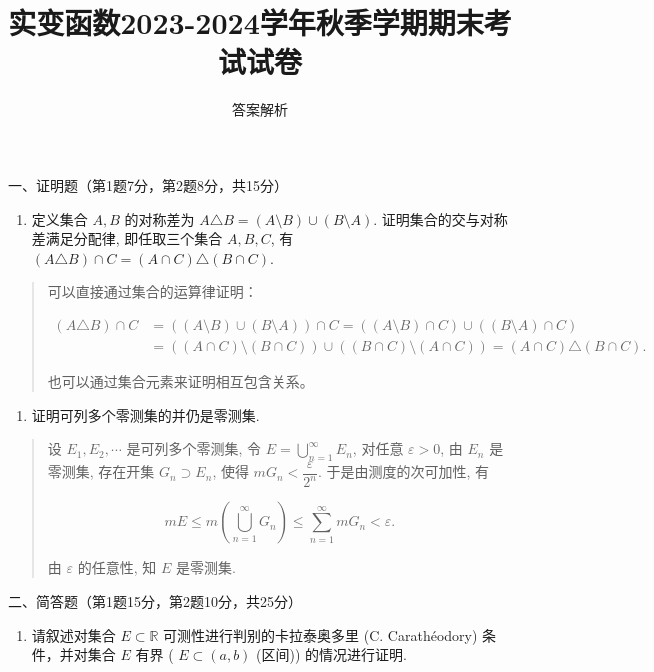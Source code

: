\documentclass[
]{article}
\title{实变函数2023-2024学年秋季学期期末考试试卷}
\subtitle{答案解析}
\author{}
\date{}
\providecommand{\tightlist}{%
  \setlength{\itemsep}{0pt}\setlength{\parskip}{0pt}}
\begin{document}
\maketitle

一、证明题（第1题7分，第2题8分，共15分）

\begin{enumerate}
\def\labelenumi{\arabic{enumi}.}
\tightlist
\item
  定义集合 \(A, B\) 的对称差为
  \(A \triangle B = (A \setminus B) \cup (B \setminus A)\).
  证明集合的交与对称差满足分配律, 即任取三个集合 \(A, B, C\), 有
  \((A \triangle B) \cap C = (A \cap C) \triangle (B \cap C)\).
\end{enumerate}

\begin{quote}
可以直接通过集合的运算律证明：

\[\begin{aligned}
(A \triangle B) \cap C & = ((A \setminus B) \cup (B \setminus A)) \cap C = ((A \setminus B) \cap C) \cup ((B \setminus A) \cap C) \\
& = ((A \cap C) \setminus (B \cap C)) \cup ((B \cap C) \setminus (A \cap C)) = (A \cap C) \triangle (B \cap C).
\end{aligned}\]

也可以通过集合元素来证明相互包含关系。
\end{quote}

\begin{enumerate}
\def\labelenumi{\arabic{enumi}.}
\setcounter{enumi}{1}
\tightlist
\item
  证明可列多个零测集的并仍是零测集.
\end{enumerate}

\begin{quote}
设 \(E_1, E_2, \cdots\) 是可列多个零测集, 令
\(E = \bigcup\limits_{n=1}^{\infty} E_n\), 对任意 \(\varepsilon > 0\),
由 \(E_n\) 是零测集, 存在开集 \(G_n \supset E_n\), 使得
\(m G_n < \dfrac{\varepsilon}{2^n}\). 于是由测度的次可加性, 有

\[m E \leqslant m\left( \bigcup\limits_{n=1}^{\infty} G_n \right) \leqslant \sum\limits_{n=1}^{\infty} m G_n < \varepsilon.\]

由 \(\varepsilon\) 的任意性, 知 \(E\) 是零测集.
\end{quote}

二、简答题（第1题15分，第2题10分，共25分）

\begin{enumerate}
\def\labelenumi{\arabic{enumi}.}
\tightlist
\item
  请叙述对集合 \(E\subset \mathbb{R}\) 可测性进行判别的卡拉泰奥多里 (C.
  Carathéodory) 条件，并对集合 \(E\) 有界 ( \(E \subset (a, b)\) (区间))
  的情况进行证明.
\end{enumerate}
\end{document}
